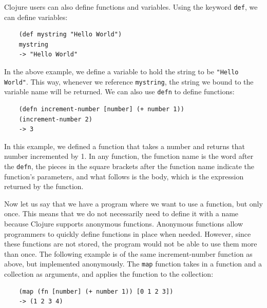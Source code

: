 \documentclass[12pt]{article}
\newcommand{\comment}[1]{{\bf \tt  {#1}}}
\newcommand{\emcomment}[1]{\textcolor{ForestGreen}{\comment{Elena: {#1}}}}
\begin{document}

Clojure users can also define functions and variables.
Using the keyword \texttt{def}, we can define variables:
\begin{verbatim}
	(def mystring "Hello World")
	mystring
	-> "Hello World"
\end{verbatim}

In the above example, we define a variable to hold the string to be \texttt{"Hello World"}. This way,
whenever we reference 
\texttt{mystring}, the string we bound to the variable name will be returned. We can also use
\texttt{defn} to define functions:
\begin{verbatim}
	(defn increment-number [number] (+ number 1))
	(increment-number 2)
	-> 3
\end{verbatim}

In this example, we defined
a function that takes a number and returns that number incremented by 1.
In any function, the function name is the word after the \texttt{defn}, the pieces in the square
brackets after the function name indicate the function's parameters, and what follows is the body, 
which is the expression returned by the function.

Now let us say that we have a program where we want to use a function, but only once. This means that
we do not necessarily need to define it with a name because Clojure supports anonymous functions.
Anonymous functions allow programmers to quickly define functions in place
when needed. 
However, since these functions are not  stored, the program would not be able to use them more than
once. 
The following example is of the same increment-number function as above, but implemented anonymously.
The \texttt{map} function takes in a function and a collection as arguments, and applies the function
to the collection: 
\begin{verbatim}
	(map (fn [number] (+ number 1)) [0 1 2 3])
	-> (1 2 3 4)
\end{verbatim}
\end{document}
